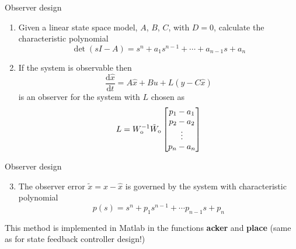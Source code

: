 \documentclass[10pt]{beamer-control}
\begin{document}
\begin{frame}{Observer design}
  \begin{enumerate}
    \item Given a linear state space model, $A$, $B$, $C$, with $D=0$, calculate the characteristic polynomial
      \begin{equation}
        \operatorname{det}(sI-A) = s^n+a_1s^{n-1}+\cdots + a_{n-1}s+a_n
      \end{equation}
    \item If the system is observable then
      \begin{equation}
        \frac{\mathrm{d}\hat{x}}{\mathrm{d}t} = A\hat{x}+Bu+L(y-C\hat{x})
      \end{equation}
      is an observer for the system with $L$ chosen as
      \begin{equation}
        L= W_{\mathrm{o}}^{-1} \tilde{W}_{\mathrm o}\begin{bmatrix}
          p_1-a_1\\ p_2-a_2 \\ \vdots \\ p_n-a_n
        \end{bmatrix}
      \end{equation}

  \end{enumerate}
\end{frame}

\begin{frame}{Observer design}
  \begin{enumerate}
    \setcounter{enumi}{2}
    \item The observer error $\tilde{x}=x-\hat{x}$ is governed by the system with characteristic polynomial
      \begin{equation}
        p(s) = s^n+p_1 s^{n-1}+ \cdots p_{n-1}s+p_n
      \end{equation}
  \end{enumerate}
  This method is implemented in Matlab in the functions \textbf{acker} and \textbf{place} (same as for state feedback controller design!)
\end{frame}




\end{document}

